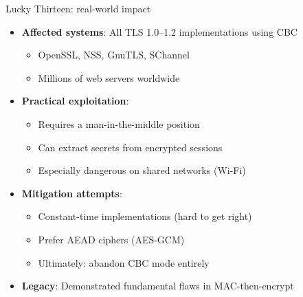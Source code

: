 \ifdefined\PRESENTATION\else\PassOptionsToClass{handout}{beamer}\fi\documentclass[aspectratio=169, lualatex]{beamer}
\begin{document}
\begin{frame}{Lucky Thirteen: real-world impact}
	\begin{itemize}
		\item \textbf{Affected systems}: All TLS 1.0--1.2 implementations using CBC
		      \begin{itemize}
			      \item OpenSSL, NSS, GnuTLS, SChannel
			      \item Millions of web servers worldwide
		      \end{itemize}
		\item \textbf{Practical exploitation}:
		      \begin{itemize}
			      \item Requires a man-in-the-middle position
			      \item Can extract secrets from encrypted sessions
			      \item Especially dangerous on shared networks (Wi-Fi)
		      \end{itemize}
		\item \textbf{Mitigation attempts}:
		      \begin{itemize}
			      \item Constant-time implementations (hard to get right)
			      \item Prefer AEAD ciphers (AES-GCM)
			      \item Ultimately: abandon CBC mode entirely
		      \end{itemize}
		\item \textbf{Legacy}: Demonstrated fundamental flaws in MAC-then-encrypt
	\end{itemize}
\end{frame}
\end{document}
